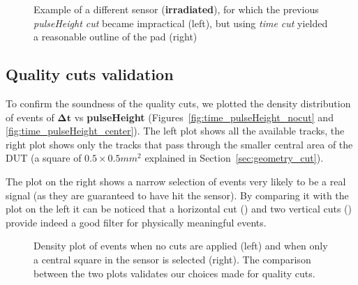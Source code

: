 \begin{figure}[ht]
    \centering
    \hfill
    \centering
    \captionsetup{width=\captionwidth}
    \caption{Example of a different sensor (\textbf{irradiated}), for which the previous \textit{pulseHeight cut} became impractical (left), but using \textit{time cut} yielded a reasonable outline of the pad (right)}
\end{figure}

\subsection{Quality cuts validation}

To confirm the soundness of the quality cuts, we plotted the density distribution of events of $\boldsymbol{\Delta t}$ vs \textbf{pulseHeight} (Figures~\ref{fig:time_pulseHeight_nocut} and \ref{fig:time_pulseHeight_center}). The left plot shows all the available tracks, the right plot shows only the tracks that pass through the smaller central area of the DUT (a square of \(0.5\times0.5\si{mm^2}\) explained in Section~\ref{sec:geometry_cut}).

The plot on the right shows a narrow selection of events very likely to be a real signal (as they are guaranteed to have hit the sensor). By comparing it with the plot on the left it can be noticed that a horizontal cut () and two vertical cuts () provide indeed a good filter for physically meaningful events. 


\begin{figure}[!ht]
    \centering
    \hfill
    \centering
    \captionsetup{width=\captionwidth}
        \caption{Density plot of events when no cuts are applied (left) and when only a central square in the sensor is selected (right). The comparison between the two plots validates our choices made for quality cuts.}
\end{figure}


